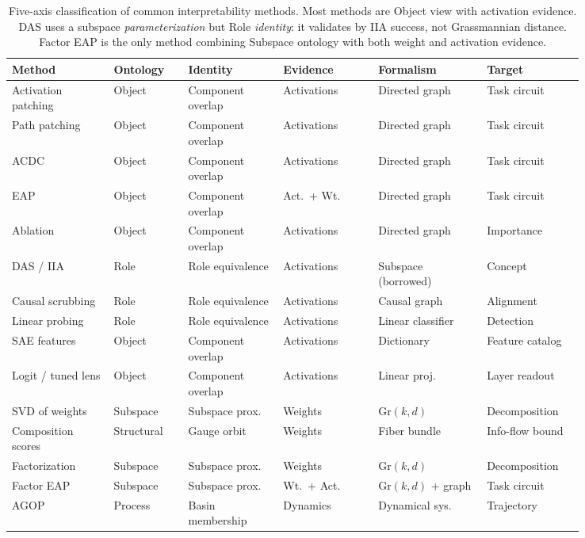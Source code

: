 \documentclass[11pt]{article}
\theoremstyle{remark}
\newcommand{\Gr}{\mathrm{Gr}}
\begin{document}
\begin{table}[ht]
\centering
\small
\setlength{\tabcolsep}{3.5pt}
\begin{tabular}{p{0.15\linewidth}p{0.11\linewidth}p{0.14\linewidth}p{0.14\linewidth}p{0.16\linewidth}p{0.14\linewidth}}
\toprule
\textbf{Method} & \textbf{Ontology} & \textbf{Identity} & \textbf{Evidence} & \textbf{Formalism} & \textbf{Target} \\
\midrule
Activation patching & Object & Component overlap & Activations & Directed graph & Task circuit \\[2pt]
Path patching       & Object & Component overlap & Activations & Directed graph & Task circuit \\[2pt]
ACDC                & Object & Component overlap & Activations & Directed graph & Task circuit \\[2pt]
EAP                 & Object & Component overlap & Act.\ + Wt. & Directed graph & Task circuit \\[2pt]
Ablation            & Object & Component overlap & Activations & Directed graph & Importance \\[2pt]
DAS / IIA           & Role   & Role equivalence  & Activations & Subspace (borrowed) & Concept \\[2pt]
Causal scrubbing    & Role   & Role equivalence  & Activations & Causal graph & Alignment \\[2pt]
Linear probing      & Role   & Role equivalence  & Activations & Linear classifier & Detection \\[2pt]
SAE features        & Object & Component overlap & Activations & Dictionary & Feature catalog \\[2pt]
Logit / tuned lens  & Object & Component overlap & Activations & Linear proj. & Layer readout \\[2pt]
SVD of weights      & Subspace & Subspace prox. & Weights & $\Gr(k,d)$ & Decomposition \\[2pt]
Composition scores  & Structural & Gauge orbit  & Weights & Fiber bundle & Info-flow bound \\[2pt]
Factorization       & Subspace & Subspace prox. & Weights & $\Gr(k,d)$ & Decomposition \\[2pt]
Factor EAP          & Subspace & Subspace prox. & Wt.\ + Act. & $\Gr(k,d)$ + graph & Task circuit \\[2pt]
AGOP                & Process & Basin membership  & Dynamics & Dynamical sys. & Trajectory \\
\bottomrule
\end{tabular}
\caption{Five-axis classification of common interpretability methods.  Most
  methods are Object view with activation evidence.  DAS uses a subspace
  \emph{parameterization} but Role \emph{identity}: it validates by IIA
  success, not Grassmannian distance.  Factor EAP is the only method
  combining Subspace ontology with both weight and activation evidence.}
\label{tab:methods}
\end{table}
\end{document}
